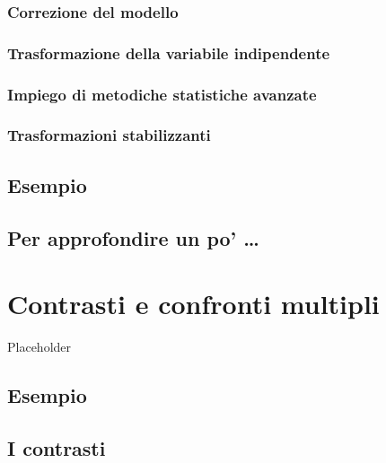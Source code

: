 \documentclass[a4paper,12pt,oneside]{book}
\begin{document}
\hypertarget{correzione-del-modello}{%
\subsection{Correzione del modello}\label{correzione-del-modello}}

\hypertarget{trasformazione-della-variabile-indipendente}{%
\subsection{Trasformazione della variabile indipendente}\label{trasformazione-della-variabile-indipendente}}

\hypertarget{impiego-di-metodiche-statistiche-avanzate}{%
\subsection{Impiego di metodiche statistiche avanzate}\label{impiego-di-metodiche-statistiche-avanzate}}

\hypertarget{trasformazioni-stabilizzanti}{%
\subsection{Trasformazioni stabilizzanti}\label{trasformazioni-stabilizzanti}}

\hypertarget{esempio}{%
\section{Esempio}\label{esempio}}

\hypertarget{per-approfondire-un-po-6}{%
\section{Per approfondire un po' \ldots{}}\label{per-approfondire-un-po-6}}

\hypertarget{contrasti-e-confronti-multipli}{%
\chapter{Contrasti e confronti multipli}\label{contrasti-e-confronti-multipli}}

Placeholder

\hypertarget{esempio-1}{%
\section{Esempio}\label{esempio-1}}

\hypertarget{i-contrasti}{%
\section{I contrasti}\label{i-contrasti}}
\end{document}
